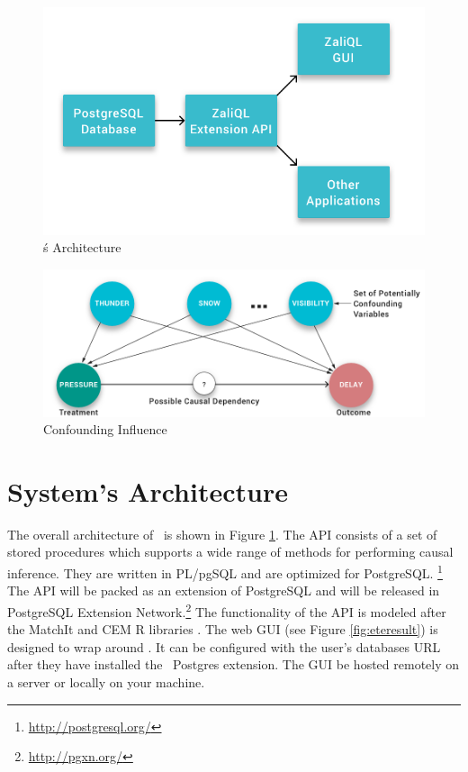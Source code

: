 
\begin{figure}
 \includegraphics[scale=0.25]{Figures/System-Overview.png}
 \caption{\GSQLB\'s Architecture}
  \label{fig:arch}
  \vspace{-3mm}
\end{figure}

\begin{figure}
\hspace*{.3cm}\includegraphics[scale=0.2]{figures/Scenario-Graph.png}
\caption{Confounding Influence}

\label{fig:cv}
\vspace{-0.3cm}
\end{figure}

\section{System's Architecture}

The overall architecture of \GSQL\ is shown in Figure \ref{fig:arch}.
The API consists of a set of stored procedures which supports a wide range of methods for performing causal inference.  They are written in PL/pgSQL and are optimized for PostgreSQL. \footnote{\url{http://postgresql.org/}}
The API will be packed  as an extension of  PostgreSQL and will be released in 
PostgreSQL Extension Network.\footnote{\url{http://pgxn.org/}}
The functionality of the API is modeled after the MatchIt and CEM R libraries \cite{ho2005,iacus2009cem}. The web GUI (see Figure \ref{fig:eteresult}) is designed to wrap around \GSQL. It can be configured with the user's databases URL after they have installed the \GSQL\ Postgres extension. The  GUI be hosted remotely on a server or locally on your machine. 
